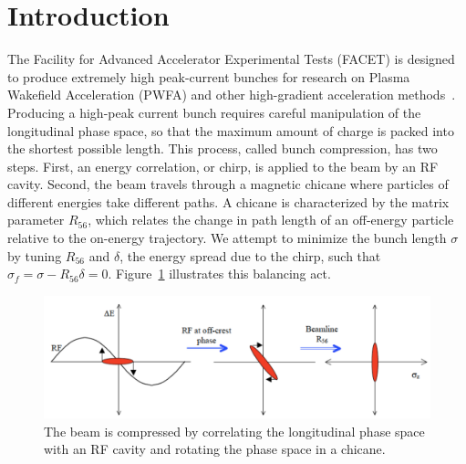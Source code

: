 \documentclass[%
twocolumn,
showpacs,preprintnumbers,
 aps,
prstab,
]{revtex4-1}
\begin{document}

\maketitle







\section{Introduction}
The Facility for Advanced Accelerator Experimental Tests (FACET) is designed to produce extremely high peak-current bunches for research on Plasma Wakefield Acceleration (PWFA) and other high-gradient acceleration methods~\cite{mjh_facet}. Producing a high-peak current bunch requires careful manipulation of the longitudinal phase space, so that the maximum amount of charge is packed into the shortest possible length. This process, called bunch compression, has two steps. First, an energy correlation, or chirp, is applied to the beam by an RF cavity. Second, the beam travels through a magnetic chicane where particles of different energies take different paths. A chicane is characterized by the matrix parameter $R_{56}$, which relates the change in path length of an off-energy particle relative to the on-energy trajectory. We attempt to minimize the bunch length $\sigma$ by tuning $R_{56}$ and $\delta$, the energy spread due to the chirp, such that $\sigma_f = \sigma-R_{56}\delta = 0$. Figure~\ref{bc} illustrates this balancing act.

\begin{figure}[htb]
\includegraphics[width=\columnwidth]{figures/bc.pdf}
  \caption{The beam is compressed by correlating the longitudinal phase space with an RF cavity and rotating the phase space in a chicane.}
  \label{bc}
\end{figure}
\end{document}
